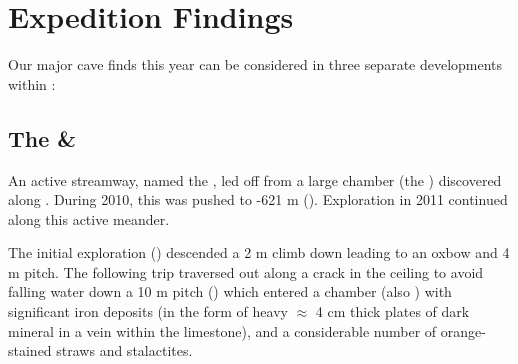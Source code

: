 
\section{Expedition Findings}

Our major cave finds this year can be considered in three separate
developments within :


\subsection{\texorpdfstring{The  \& }{The Serpentine \& Let na Drugi Svet}}

An active streamway, named the , led off from a large
chamber (the ) discovered along . During 2010, this was pushed to -621 m (). Exploration in 2011 continued along this active
meander.

The initial exploration () descended a 2 m climb down leading
to an oxbow and 4 m pitch. The following trip traversed out along a
crack in the ceiling to avoid falling water down a 10 m pitch
() which entered a chamber (also ) with
significant iron deposits (in the form of heavy $\approx$ 4 cm
thick plates of dark mineral in a vein within the limestone), and a
considerable number of orange-stained straws and stalactites.

